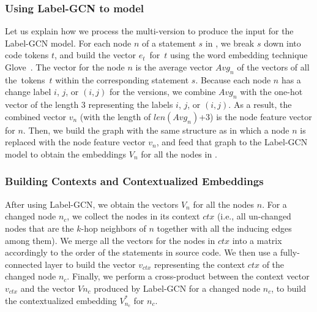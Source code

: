 \subsubsection{{\bf Using Label-GCN to model {\mvpdg}}}
\label{sec:preprocess}
Let us explain how we process the multi-version {\mvpdg} to produce
the input for the Label-GCN model. For each node $n$ of a statement
$s$ in {\mvpdg}, we break $s$ down into code tokens $t$, and build
the vector $e_t$~for~$t$ using the word embedding technique
Glove~\cite{glove2014}. The vector for the node $n$ is the average vector
$Avg_n$ of the vectors of all the~tokens~$t$ within the corresponding
statement $s$. Because each node $n$ has a change label $i$, $j$, or
$(i,j)$ for the versions, we combine $Avg_n$ with the one-hot vector
of the length 3 representing the labels $i$, $j$, or $(i,j)$. As a
result, the combined vector $v_n$ (with the length of $len(Avg_n)$+3)
is the node feature vector for $n$. Then, we build the graph with the
same structure as {\mvpdg} in which a node $n$ is replaced with the
node feature vector $v_n$, and feed that graph to the Label-GCN model to obtain
the embeddings $V_n$ for all the nodes in {\mvpdg}.




\subsubsection{{\bf Building Contexts and Contextualized Embeddings}}
After using Label-GCN, we obtain the vectors $V_n$ for all the nodes
$n$. For a changed node $n_c$, we collect the nodes in its context
$ctx$ (i.e., all un-changed nodes that are the $k$-hop neighbors of $n$
together with all the inducing edges among them). We merge all the
vectors for the nodes in $ctx$ into a matrix accordingly to the order
of the statements in source code. We then use a fully-connected layer
to build the vector $v_{ctx}$ representing the context $ctx$ of the
changed node $n_c$.
%
Finally, we perform a cross-product between the context vector $v_{ctx}$ and
the vector $V{n_c}$ produced by Label-GCN for a changed node $n_c$, to
build the contextualized embedding $V^{*}_{n_c}$ for $n_c$.

